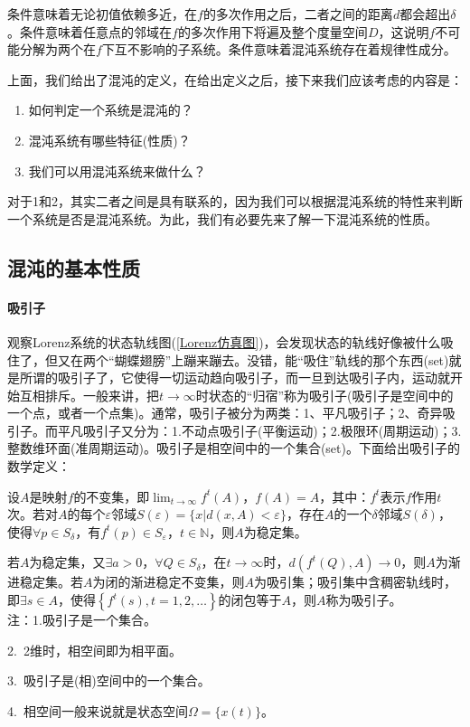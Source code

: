         \par
        条件意味着无论初值依赖多近，在$f$的多次作用之后，二者之间的距离$d$都会超出$\delta$。条件意味着任意点的邻域在$f$的多次作用下将遍及整个度量空间$D$，这说明$f$不可能分解为两个在$f$下互不影响的子系统。条件意味着混沌系统存在着规律性成分。
        \par
        上面，我们给出了混沌的定义，在给出定义之后，接下来我们应该考虑的内容是：
        \begin{enumerate}
       \item 如何判定一个系统是混沌的？
        \item 混沌系统有哪些特征(性质)？
        \item 我们可以用混沌系统来做什么？
        \end{enumerate}
        \par
        对于1和2，其实二者之间是具有联系的，因为我们可以根据混沌系统的特性来判断一个系统是否是混沌系统。为此，我们有必要先来了解一下混沌系统的性质。
    \subsection{混沌的基本性质}
        \paragraph{吸引子}观察Lorenz系统的状态轨线图(\ref{Lorenz仿真图})，会发现状态的轨线好像被什么吸住了，但又在两个“蝴蝶翅膀”上蹦来蹦去。没错，能“吸住”轨线的那个东西(set)就是所谓的吸引子了，它使得一切运动趋向吸引子，而一旦到达吸引子内，运动就开始互相排斥。一般来讲，把$t\rightarrow\infty$时状态的“归宿”称为吸引子(吸引子是空间中的一个点，或者一个点集)。通常，吸引子被分为两类：1、平凡吸引子；2、奇异吸引子。而平凡吸引子又分为：1.不动点吸引子(平衡运动)；2.极限环(周期运动)；3.整数维环面(准周期运动)。吸引子是相空间中的一个集合(set)。下面给出吸引子的数学定义：
        \par
        设$A$是映射$f$的不变集，即$\lim_{t\rightarrow\infty}f^t(A)$，$f(A)=A$，其中：$f^t$表示$f$作用$t$次。若对$A$的每个$\varepsilon$邻域$S(\varepsilon)=\{x|d(x,A)<\varepsilon\}$，存在$A$的一个$\delta$邻域$S(\delta)$，使得$\forall p \in S_\delta $，有$f^t(p)\in S_\varepsilon$，$t\in \mathbb{N}$，则$A$为稳定集。
        \par
        若$A$为稳定集，又$\exists a > 0$，$\forall Q \in S_\delta $，在$t\rightarrow\infty$时，$d(f^t(Q),A)\rightarrow 0$，则$A$为渐进稳定集。若$A$为闭的渐进稳定不变集，则$A$为吸引集；吸引集中含稠密轨线时，即$\exists s \in A$，使得$\left\{f^t(s),t=1,2,\dots \right\}$的闭包等于$A$，则$A$称为吸引子。\\
        注：1.吸引子是一个集合。
        \par
        2.\ 2维时，相空间即为相平面。
        \par
        3.\ 吸引子是(相)空间中的一个集合。
        \par
        4.\ 相空间一般来说就是状态空间$\Omega=\{x(t)\}$。
